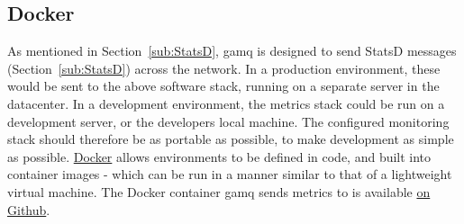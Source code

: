 \subsection{Docker}
\label{sub:dockerDesign}

As mentioned in Section~\ref{sub:StatsD}, gamq is designed to send StatsD
messages (Section~\ref{sub:StatsD}) across the network. In a production
environment, these would be sent to the above software stack, running on a
separate server in the datacenter. In a development environment, the metrics
stack could be run on a development server, or the developers local machine. The
configured monitoring stack should therefore be as portable as possible, to make
development as simple as possible. \href{https://www.docker.com/}{Docker} allows
environments to be defined in code, and built into container images - which can
be run in a manner similar to that of a lightweight virtual machine. The Docker
container gamq sends metrics to is available
\href{https://github.com/FireEater64/docker-statsd-influxdb-grafana}{on Github}.
